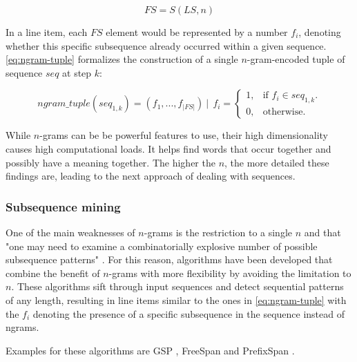 \begin{equation}\label{eq:ngram-fs-construction}
    FS = S(LS, n)
\end{equation}

In a line item, each $FS$ element would be represented by a number $f_i$, denoting whether this specific subsequence already occurred within a given sequence. \autoref{eq:ngram-tuple} formalizes the construction of a single $n$-gram-encoded tuple of sequence $seq$ at step $k$:

\begin{equation}\label{eq:ngram-tuple}
    ngram\_tuple(seq_{1,k}) = (f_1, ..., f_{|FS|})\ |\ \ f_i = 
    \begin{cases}
    1, & \text{if $f_i \in seq_{1,k}$}.\\
    0, & \text{otherwise}.
    \end{cases}
\end{equation}

While $n$-grams can be be powerful features to use, their high dimensionality causes high computational loads. It helps find words that occur together and possibly have a meaning together. The higher the $n$, the more detailed these findings are, leading to the next approach of dealing with sequences.

\subsubsection*{Subsequence mining}
One of the main weaknesses of $n$-grams is the restriction to a single $n$ and that "one may need to examine a combinatorially explosive
number of possible subsequence patterns" \cite{pei2001prefixspan}. For this reason, algorithms have been developed that combine the benefit of $n$-grams with more flexibility by avoiding the limitation to $n$. These algorithms sift through input sequences and detect sequential patterns of any length, resulting in line items similar to the ones in \autoref{eq:ngram-tuple} with the $f_i$ denoting the presence of a specific subsequence in the sequence instead of ngrams.

Examples for these algorithms are GSP \cite{srikant1996gsp}, FreeSpan \cite{han2000freespan} and PrefixSpan \cite{pei2001prefixspan}.